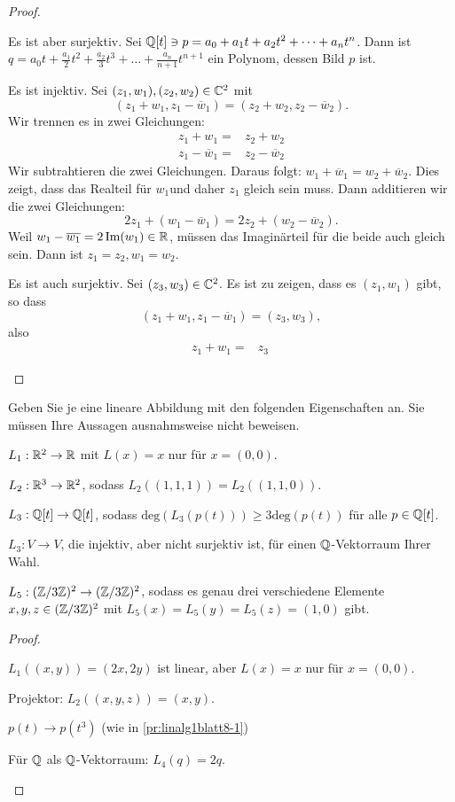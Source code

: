 \begin{proof}
\begin{parts}
		Es ist aber surjektiv. Sei $\mathbb{Q}[t]\ni p=a_0+a_1t+a_2t^2+\dots + a_nt^n$. Dann ist $q=a_0t+\frac{a_1}{2}t^2+\frac{a_2}{3}t^3+\dots + \frac{a_n}{n+1}t^{n+1}$ ein Polynom, dessen Bild $p$ ist.
	\item Es ist injektiv. Sei $(z_1,w_1),(z_2,w_2)\in \mathbb{C}^2$ mit
		\[
			(z_1+w_1, z_1-\overline{w}_1)=(z_2+w_2,z_2-\overline{w}_2)
		.\] 
	Wir trennen es in zwei Gleichungen:
	\begin{align*}
		z_1+w_1=&z_2+w_2\\
		z_1-\overline{w}_1=&z_2-\overline{w}_2
	\end{align*}
	Wir subtrahtieren die zwei Gleichungen. Daraus folgt: $w_1+\overline{w}_1=w_2+\overline{w}_2$. Dies zeigt, dass das Realteil f\"{u}r $w_1$und daher $z_1$ gleich sein muss. Dann additieren wir die zwei Gleichungen:
	\[
	2z_1+(w_1-\overline{w}_1)=2z_2+(w_2-\overline{w}_2)
	.\] 
	Weil $w_1-\overline{w_1}=2\Im(w_1)\in \mathbb{R}$, müssen das Imaginärteil f\"{u}r die beide auch gleich sein. Dann ist $z_1=z_2,w_1=w_2$.

	Es ist auch surjektiv. Sei $(z_3,w_3)\in \mathbb{C}^2$. Es ist zu zeigen, dass es $(z_1,w_1)$ gibt, so dass
	\[
		(z_1+w_1,z_1-\overline{w}_1)=(z_3,w_3)
	,\]
	also
	\begin{align*}
		z_1+w_1=&z_3\
	\end{align*}
	\end{parts}
\end{proof}
\begin{Problem}
Geben Sie je eine lineare Abbildung mit den folgenden Eigenschaften an. Sie müssen Ihre Aussagen ausnahmsweise nicht beweisen. 	
\begin{parts}
\item $L_1:\mathbb{R}^2\to \mathbb{R}$ mit $L(x)=x$ nur f\"{u}r $x=(0,0)$.
\item $L_2:\mathbb{R}^3\to \mathbb{R}^2$, sodass $L_2((1,1,1))=L_2((1,1,0))$.
\item $L_3:\mathbb{Q}[t]\to \mathbb{Q}[t]$, sodass $\text{deg}(L_3(p(t)))\ge 3\text{deg}(p(t))$ f\"{u}r alle $p\in \mathbb{Q}[t]$.
\item $L_3:V \to V$, die injektiv, aber nicht surjektiv ist, für einen $\mathbb{Q}$-Vektorraum Ihrer Wahl. 
\item $L_5:(\mathbb{Z} / 3\mathbb{Z})^2\to (\mathbb{Z} / 3\mathbb{Z})^2$, sodass es genau drei verschiedene Elemente $x,y,z\in (\mathbb{Z} / 3\mathbb{Z})^2$ mit $L_5(x)=L_5(y)=L_5(z)=(1,0)$ gibt. 
\end{parts}
\end{Problem}
\begin{proof}
	\begin{parts}
	\item $L_1((x,y))=(2x,2y)$ ist linear, aber $L(x)=x$ nur f\"{u}r $x=(0,0)$.
	\item Projektor: $L_2((x,y,z))=(x,y)$.
	\item $p(t)\to p(t^3)$ (wie in \ref{pr:linalg1blatt8-1})
	\item F\"{u}r $\mathbb{Q}$ als $\mathbb{Q}$-Vektorraum: $L_4(q)=2q$.
	\end{parts}
\end{proof}


